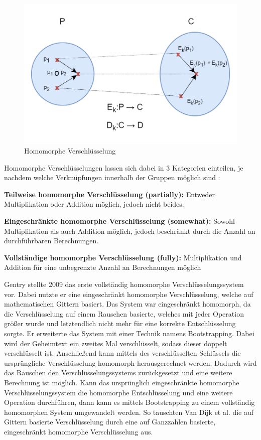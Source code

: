 \begin{figure}[!htb]
    \centering
    \includegraphics[width=12cm]{figures/homo_enc.png}
    \caption{Homomorphe Verschlüsselung}
    \label{fig:homo_enc}
\end{figure} 

Homomorphe Verschlüsselungen lassen sich dabei in 3 Kategorien einteilen, je nachdem welche Verknüpfungen innerhalb der Gruppen möglich sind \cite{P-42}:
\begin{compactitem}
\item \textbf{Teilweise homomorphe Verschlüsselung (partially):} Entweder Multiplikation oder Addition möglich, jedoch nicht beides.
\item \textbf{Eingeschränkte homomorphe Verschlüsselung (somewhat):} Sowohl Multiplikation als auch Addition möglich, jedoch beschränkt durch die Anzahl an durchführbaren Berechnungen. 
\item \textbf{Vollständige homomorphe Verschlüsselung (fully):} Multiplikation und Addition für eine unbegrenzte Anzahl an Berechnungen möglich
\end{compactitem}

Gentry \cite{P-40} stellte 2009 das erste vollständig homomorphe Verschlüsselungssystem vor.
Dabei nutzte er eine eingeschränkt homomorphe Verschlüsselung, welche auf mathematischen Gittern basiert.
Das System war eingeschränkt homomorph, da die Verschlüsselung auf einem Rauschen basierte, welches mit jeder Operation größer wurde und letztendlich nicht mehr für eine korrekte Entschlüsselung sorgte.
Er erweiterte das System mit einer Technik namens Bootstrapping.
Dabei wird der Geheimtext ein zweites Mal verschlüsselt, sodass dieser doppelt verschlüsselt ist.
Anschließend kann mittels des verschlüsselten Schlüssels die ursprüngliche Verschlüsselung homomorph herausgerechnet werden. 
Dadurch wird das Rauschen den Verschlüsselungssystems zurückgesetzt und eine weitere Berechnung ist möglich. 
Kann das ursprünglich eingeschränkte homomorphe Verschlüsselungssystem die homomorphe Entschlüsselung und eine weitere Operation durchführen, dann kann es mittels Bootstrapping zu einem vollständig homomorphen System umgewandelt werden.
So tauschten Van Dijk et al. \cite{P-100} die auf Gittern basierte Verschlüsselung durch eine auf Ganzzahlen basierte, eingeschränkt homomorphe Verschlüsselung aus. 

